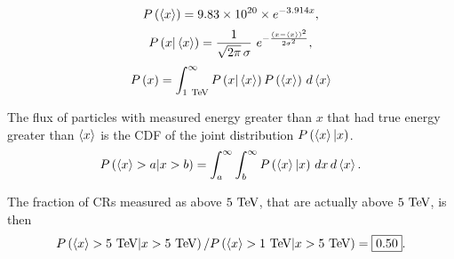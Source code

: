 \begin{equation}
  P\left(\left<x\right>\right) = \num{9.83e20}\times e^{-3.914 x},
\end{equation}
\begin{equation}
  P\left(x|\left<x\right>\right) = \frac{1}{\sqrt{2\pi}\,\sigma}\ e^{-\frac{(x-\left<x\right>)^2}{2\sigma^2}},
\end{equation}
\begin{equation}
  P\left(x\right) = \int_{1~\text{TeV}}^\infty P\left(x|\left<x\right>\right) P\left(\left<x\right>\right)\, d\left<x\right>
\end{equation}

The flux of particles with measured energy greater than $x$ that had true energy greater than $\left<x\right>$ is the CDF of the joint distribution $P\left(\left<x\right>|x\right)$.
\begin{equation}
  P\left(\left<x\right>>a|x>b\right) = \int_a^\infty \int_b^\infty P\left(\left<x\right>|x\right)\, dx\, d\left<x\right>.
\end{equation}

The fraction of CRs measured as above $5~\text{TeV}$, that are actually above $5~\text{TeV}$, is then
\begin{equation}
  P\left(\left<x\right>>5~\text{TeV}|x>5~\text{TeV}\right) / P\left(\left<x\right>>1~\text{TeV}|x>5~\text{TeV}\right) = \boxed{ 0.50 }.
\end{equation}

